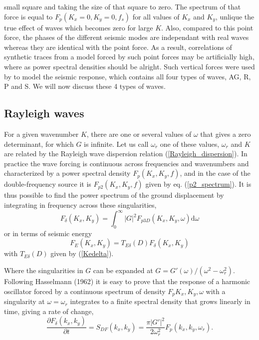 small square and taking the size of that square to zero. The spectrum of that force is equal to $F_{p}(K_x=0,K_y=0,f_s)$ for all values of $K_x$ and $K_y$, 
unlique the true effect of waves which becomes zero for large $K$. Also, compared to this point force, the phases of the different seismic modes are independant 
with real waves whereas they are identical with the point force. As a result, correlations of synthetic traces from a model forced 
by such point forces may be artificially high, where as power spectral densities should be alright. Such vertical forces were used by \cite{Gualtieri&al.2013} to 
model the seismic response, which contains all four types of waves, AG, R, P and S. We will now discuss these 4 types of waves. 

\subsection{Rayleigh waves}
For a given wavenumber $K$, there are one or several 
values of $\omega$ that gives a zero determinant, for which $G$ is infinite. Let us call $\omega_r$ one of these values, 
$\omega_r$ and $K$ are related by the Rayleigh wave dispersion relation 
(\ref{Rayleigh_dispersion}). 
In practice the wave forcing is continuous across frequencies and wavenumbers 
and characterized by a power spectral density $F_{p}(K_x,K_y,f)$, and in the case of the double-frequency source it is $F_{p2}(K_x,K_y,f)$ given by eq. (\ref{p2_spectrum}). It is thus possible 
to find the power spectrum of the ground displacement by integrating in frequency across these 
singularities, 
\begin{equation}
F_\delta(K_x,K_y) = \int_{0}^{\infty} \left|G\right|^2 F_{p3D}(K_x,K_y,\omega) {\mathrm d}{\omega}
\end{equation}
or in terms of seismic energy
\begin{equation}
F_E(K_x,K_y) = T_{E \delta}(D)  F_\delta (K_x,K_y) 
\end{equation}
with $ T_{E \delta}(D)$ given by (\ref{Kedelta}). 

Where the singularities in $G$ can be expanded at  $G=G'(\omega)/(\omega^2-\omega_r^2)$. 
Following Hasselmann (1962)%
 it is easy to prove that 
the response of a harmonic oscillator forced by  a continuous spectrum of density $F_p{K_x,K_y,\omega}$ with a singularity at $\omega = \omega_r$
integrates to a finite spectral density 
that grows linearly in time, giving a rate of change, 
\begin{equation}
\frac{\partial F_\delta(k_x,k_y)}{\partial t} =  S_{DF}(k_x,k_y)=\frac{\pi \left|G'\right|^2}{2 \omega_r^2}F_{p}(k_x,k_y,\omega_r).
\end{equation}

